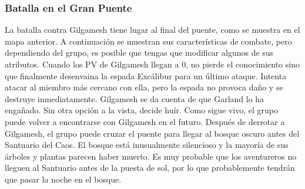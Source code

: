 \subsubsection*{Batalla en el Gran Puente}
La batalla contra Gilgamesh tiene lugar al final del puente, como se muestra en el mapa anterior. A continuación se muestran sus características de combate, pero dependiendo del grupo, es posible que tengas que modificar algunos de sus atributos. Cuando los PV de Gilgamesh llegan a 0, no pierde el conocimiento sino que finalmente desenvaina la espada Excálibur para un último ataque. Intenta atacar al miembro más cercano con ella, pero la espada no provoca daño y se destruye inmediatamente. Gilgamesh se da cuenta de que Garland lo ha engañado. Sin otra opción a la vista, decide huír. Como sigue vivo, el grupo puede volver a encontrarse con Gilgamesh en el futuro. Después de derrotar a Gilgamesh, el grupo puede cruzar el puente para llegar al bosque oscuro antes del Santuario del Caos. El bosque está inusualmente silencioso y la mayoría de sus árboles y plantas parecen haber muerto. Es muy probable que los aventureros no lleguen al Santuario antes de la puesta de sol, por lo que probablemente tendrán que pasar la noche en el bosque.

\vspace{0.5cm}



\pagebreak